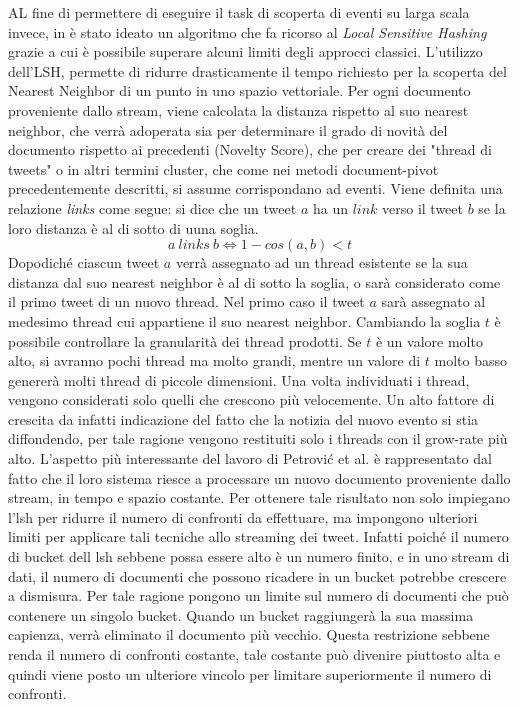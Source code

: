 AL fine di permettere di eseguire il task di scoperta di eventi su larga scala invece, in \cite{Petrovic:2010:SFS:1857999.1858020} è stato ideato un algoritmo che fa ricorso al \emph{Local Sensitive Hashing}\cite{Lsh}  grazie a cui è possibile superare alcuni limiti degli approcci classici.
L'utilizzo dell'LSH, permette di ridurre drasticamente il tempo richiesto per la scoperta del Nearest Neighbor di un punto in uno spazio vettoriale.
Per ogni documento proveniente dallo stream, viene calcolata la distanza rispetto al suo nearest neighbor, che verrà adoperata sia per determinare il grado di novità del documento rispetto ai precedenti (Novelty Score), che per creare dei "thread di tweets" o in altri termini cluster, che come nei metodi document-pivot precedentemente descritti, si assume corrispondano ad eventi. Viene definita una relazione \emph{links} come segue: si dice che un tweet   $a$ ha un $link$ verso il tweet $b$  se la loro distanza è al di sotto di uuna soglia.  
 \begin{equation}
  a \ links \ b \Longleftrightarrow 1-cos(a,b)<t
\end{equation}
Dopodiché ciascun tweet $a$  verrà  assegnato ad un thread esistente se la sua distanza dal suo nearest neighbor è al di sotto la soglia, o sarà considerato come il primo tweet di un nuovo thread. Nel primo caso il tweet $a$ sarà assegnato al medesimo thread cui appartiene il suo nearest neighbor. Cambiando la soglia $t$ 
è possibile controllare la granularità dei thread prodotti. Se $t$ è un valore molto alto, si avranno pochi thread ma molto grandi, mentre un valore di $t$ molto basso genererà molti thread di piccole dimensioni.
Una volta individuati i thread, vengono considerati solo quelli che crescono più velocemente. Un alto fattore di crescita da infatti indicazione del fatto che la notizia del nuovo evento si stia diffondendo,  per tale ragione vengono restituiti solo i threads con il grow-rate più alto. L'aspetto più interessante del lavoro di Petrovi\'c et al. \cite{Petrovic:2010:SFS:1857999.1858020} è rappresentato dal fatto che il loro sistema riesce a processare un nuovo documento proveniente dallo stream, in tempo e spazio costante.  Per ottenere tale risultato non solo impiegano l'lsh per ridurre il numero di confronti da effettuare, ma impongono ulteriori limiti per applicare tali tecniche allo streaming dei tweet. Infatti poiché il numero di bucket dell lsh sebbene possa essere alto è un numero finito, e in uno stream di dati, il numero di documenti che possono ricadere in un bucket potrebbe crescere a dismisura. Per tale ragione pongono un limite sul numero di documenti che può contenere un singolo bucket. Quando un bucket raggiungerà la sua massima capienza, verrà eliminato il documento più vecchio. Questa restrizione sebbene renda il numero di confronti costante, tale costante può divenire piuttosto alta e quindi viene posto un ulteriore vincolo per limitare superiormente il numero di confronti. 
